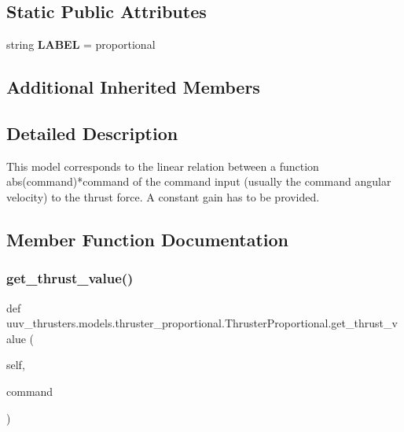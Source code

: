 \subsection*{Static Public Attributes}
\begin{DoxyCompactItemize}
\item 
\mbox{\label{classuuv__thrusters_1_1models_1_1thruster__proportional_1_1ThrusterProportional_ab3da0e36e405e748dbddccb82855361e}} 
string {\bfseries L\+A\+B\+EL} = \textquotesingle{}proportional\textquotesingle{}
\end{DoxyCompactItemize}
\subsection*{Additional Inherited Members}


\subsection{Detailed Description}
\begin{DoxyVerb}This model corresponds to the linear relation between a function
abs(command)*command of the command input (usually the command angular
velocity) to the thrust force. A constant gain has to be provided.
\end{DoxyVerb}
 

\subsection{Member Function Documentation}
\mbox{\label{classuuv__thrusters_1_1models_1_1thruster__proportional_1_1ThrusterProportional_a8ce50c4afd1fbd05d4fb700385cd69b0}} 
\subsubsection{\texorpdfstring{get\+\_\+thrust\+\_\+value()}{get\_thrust\_value()}}
{\footnotesize\ttfamily def uuv\+\_\+thrusters.\+models.\+thruster\+\_\+proportional.\+Thruster\+Proportional.\+get\+\_\+thrust\+\_\+value (\begin{DoxyParamCaption}\item[{}]{self,  }\item[{}]{command }\end{DoxyParamCaption})}

